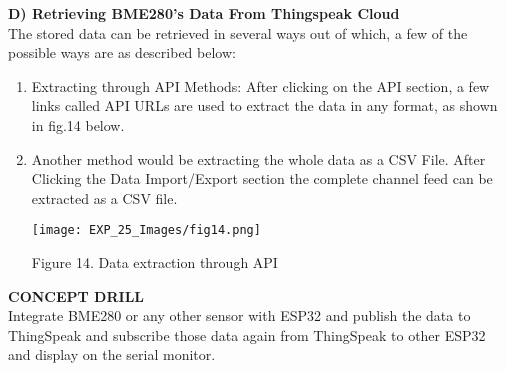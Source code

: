 \documentclass[12pt,a4paper]{article}
\begin{document}
\begin{justify}
\noindent \textbf{D)	Retrieving BME280's Data From Thingspeak Cloud}\\[6pt]
The stored data can be retrieved in several ways out of which, a few of the possible ways are as described below:
\begin{enumerate}
    \item Extracting through API Methods: After clicking on the API section, a few links called API URLs are used to extract the data in any format, as shown in fig.14 below.
\item Another method would be extracting the whole data as a CSV File. After Clicking the Data Import/Export section the complete channel feed can be extracted as a CSV file.

\begin{center} 
\texttt{[image: EXP\_25\_Images/fig14.png]}
\end{center}
\begin{center} {Figure 14. Data extraction through API }\end{center}
\end{enumerate}

\vspace{10pt}
\noindent \textbf{\large CONCEPT DRILL}\\[6pt]
Integrate BME280 or any other sensor with ESP32 and publish the data to ThingSpeak and subscribe those data again from ThingSpeak to other ESP32 and display on the serial monitor.

\end{justify}
\end{document}
